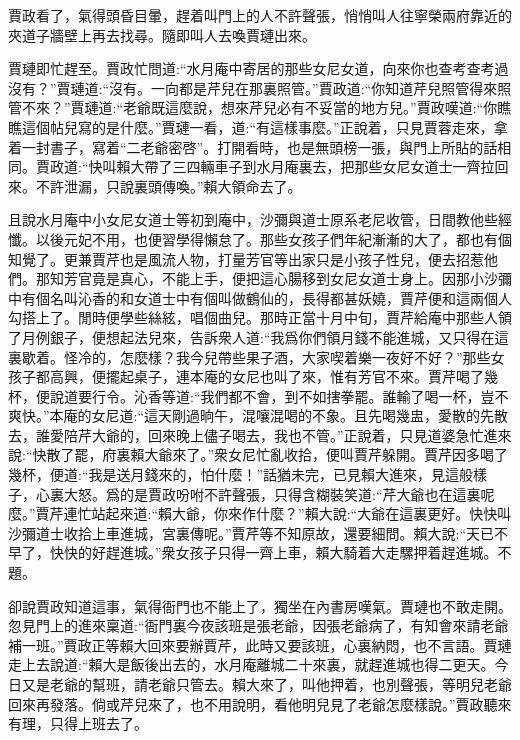 \begin{parag}
    賈政看了，氣得頭昏目暈，趕着叫門上的人不許聲張，悄悄叫人往寧榮兩府靠近的夾道子牆壁上再去找尋。隨即叫人去喚賈璉出來。
\end{parag}


\begin{parag}
    賈璉即忙趕至。賈政忙問道:“水月庵中寄居的那些女尼女道，向來你也查考查考過沒有？”賈璉道:“沒有。一向都是芹兒在那裏照管。”賈政道:“你知道芹兒照管得來照管不來？”賈璉道:“老爺既這麼說，想來芹兒必有不妥當的地方兒。”賈政嘆道:“你瞧瞧這個帖兒寫的是什麼。”賈璉一看，道:“有這樣事麼。”正說着，只見賈蓉走來，拿着一封書子，寫着“二老爺密啓”。打開看時，也是無頭榜一張，與門上所貼的話相同。賈政道:“快叫賴大帶了三四輛車子到水月庵裏去，把那些女尼女道士一齊拉回來。不許泄漏，只說裏頭傳喚。”賴大領命去了。
\end{parag}


\begin{parag}
    且說水月庵中小女尼女道士等初到庵中，沙彌與道士原系老尼收管，日間教他些經懺。以後元妃不用，也便習學得懶怠了。那些女孩子們年紀漸漸的大了，都也有個知覺了。更兼賈芹也是風流人物，打量芳官等出家只是小孩子性兒，便去招惹他們。那知芳官竟是真心，不能上手，便把這心腸移到女尼女道士身上。因那小沙彌中有個名叫沁香的和女道士中有個叫做鶴仙的，長得都甚妖嬈，賈芹便和這兩個人勾搭上了。閒時便學些絲絃，唱個曲兒。那時正當十月中旬，賈芹給庵中那些人領了月例銀子，便想起法兒來，告訴衆人道:“我爲你們領月錢不能進城，又只得在這裏歇着。怪冷的，怎麼樣？我今兒帶些果子酒，大家喫着樂一夜好不好？”那些女孩子都高興，便擺起桌子，連本庵的女尼也叫了來，惟有芳官不來。賈芹喝了幾杯，便說道要行令。沁香等道:“我們都不會，到不如搳拳罷。誰輸了喝一杯，豈不爽快。”本庵的女尼道:“這天剛過晌午，混嚷混喝的不象。且先喝幾盅，愛散的先散去，誰愛陪芹大爺的，回來晚上儘子喝去，我也不管。”正說着，只見道婆急忙進來說:“快散了罷，府裏賴大爺來了。”衆女尼忙亂收拾，便叫賈芹躲開。賈芹因多喝了幾杯，便道:“我是送月錢來的，怕什麼！”話猶未完，已見賴大進來，見這般樣子，心裏大怒。爲的是賈政吩咐不許聲張，只得含糊裝笑道:“芹大爺也在這裏呢麼。”賈芹連忙站起來道:“賴大爺，你來作什麼？”賴大說:“大爺在這裏更好。快快叫沙彌道士收拾上車進城，宮裏傳呢。”賈芹等不知原故，還要細問。賴大說:“天已不早了，快快的好趕進城。”衆女孩子只得一齊上車，賴大騎着大走騾押着趕進城。不題。
\end{parag}


\begin{parag}
    卻說賈政知道這事，氣得衙門也不能上了，獨坐在內書房嘆氣。賈璉也不敢走開。忽見門上的進來稟道:“衙門裏今夜該班是張老爺，因張老爺病了，有知會來請老爺補一班。”賈政正等賴大回來要辦賈芹，此時又要該班，心裏納悶，也不言語。賈璉走上去說道:“賴大是飯後出去的，水月庵離城二十來裏，就趕進城也得二更天。今日又是老爺的幫班，請老爺只管去。賴大來了，叫他押着，也別聲張，等明兒老爺回來再發落。倘或芹兒來了，也不用說明，看他明兒見了老爺怎麼樣說。”賈政聽來有理，只得上班去了。
\end{parag}


